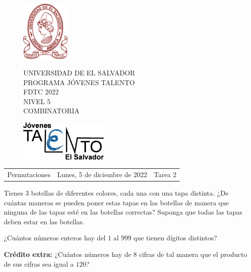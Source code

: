 \documentclass[12pt]{article}
\newcommand{\tema}{Permutaciones}
\newcommand{\fecha}{Lunes, 5 de diciembre de 2022}
\newcommand{\sesion}{Tarea 2}
\begin{document}
\thispagestyle{empty}

\begin{figure}[h] 
	\begin{minipage}[b]{0.26\textwidth}
		\begin{center}
			\includegraphics[height=3cm]{Logos/UES.png}
			\par\end{center}
	\end{minipage} 
	\begin{minipage}[b]{0.46\textwidth}
		\begin{center}
			UNIVERSIDAD DE EL SALVADOR\\ [0.1cm]
			PROGRAMA JÓVENES TALENTO\\ [0.1cm]
	        FDTC 2022\\ [0.1cm]
                NIVEL 5\\ [0.1cm]
			COMBINATORIA 
			\par\end{center}
	\end{minipage} 
	\begin{minipage}[b]{0.05\textwidth}
		\begin{center}
			\includegraphics[height=2cm]{Logos/LOGO PJT.png}
			\par\end{center}
	\end{minipage}
\end{figure}

\begin{center}
    \begin{tabular}{p{4.5cm} p{7cm} p{4.5cm}}
        \tema & \centering\fecha & \hfill\sesion
    \end{tabular}
\end{center}

\begin{problema}
Tienes $3$ botellas de diferentes colores, cada una con una tapa distinta. ¿De cuántas maneras se pueden poner estas tapas en las botellas de manera que ninguna de las tapas esté en las botellas correctas? Suponga que todas las tapas deben estar en las botellas.
\end{problema}

\begin{problema}
¿Cuántos números enteros hay del $1$ al $999$ que tienen dígitos distintos?
\end{problema}

\textbf{Crédito extra:} ¿Cuántos números hay de $8$ cifras de tal manera que el producto de sus cifras sea igual a $120$?
\end{document}
